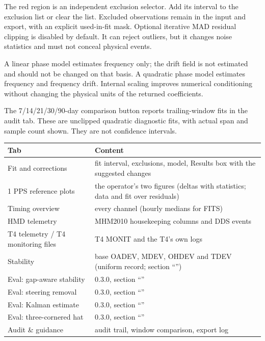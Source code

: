 \documentclass[11pt,a4paper]{article}
\renewcommand{\_}{\usscore\allowbreak}
\newenvironment{ctable}[1]{\par\begin{center}\begin{minipage}{\linewidth}\centering\small\captionof{table}{#1}}
 {\end{minipage}\end{center}}
\begin{document}
The red region is an independent exclusion selector. Add its interval to the
exclusion list or clear the list. Excluded observations remain in the input
and export, with an explicit used-in-fit mask. Optional iterative MAD residual
clipping is disabled by default. It can reject outliers, but it changes noise
statistics and must not conceal physical events.

A linear phase model estimates frequency only; the drift field is not
estimated and should not be changed on that basis. A quadratic phase model
estimates frequency and frequency drift. Internal scaling improves numerical
conditioning without changing the physical units of the returned coefficients.

The 7/14/21/30/90-day comparison button reports trailing-window fits in the audit
tab. These are unclipped quadratic diagnostic fits, with actual span and
sample count shown. They are not confidence intervals.

\begin{ctable}{GUI tabs of release 0.3.0, in order\label{tab:tabs}}
\begin{tabular}{@{}P{.3\linewidth}P{.65\linewidth}@{}}
\toprule
Tab & Content\\
\midrule
Fit and corrections & fit interval, exclusions, model, Results box with the suggested changes\\
1 PPS reference plots & the operator's two figures (deltas with statistics; data and fit over residuals)\\
Timing overview & every channel (hourly medians for FITS)\\
HMD telemetry & MHM2010 housekeeping columns and DDS events\\
T4 telemetry / T4 monitoring files & T4 MONIT and the T4's own logs\\
Stability & base OADEV, MDEV, OHDEV and TDEV (uniform record; section ``'')\\
Eval: gap-aware stability & 0.3.0, section ``''\\
Eval: steering removal & 0.3.0, section ``''\\
Eval: Kalman estimate & 0.3.0, section ``''\\
Eval: three-cornered hat & 0.3.0, section ``''\\
Audit \& guidance & audit trail, window comparison, export log\\
\bottomrule
\end{tabular}
\end{ctable}
\end{document}
